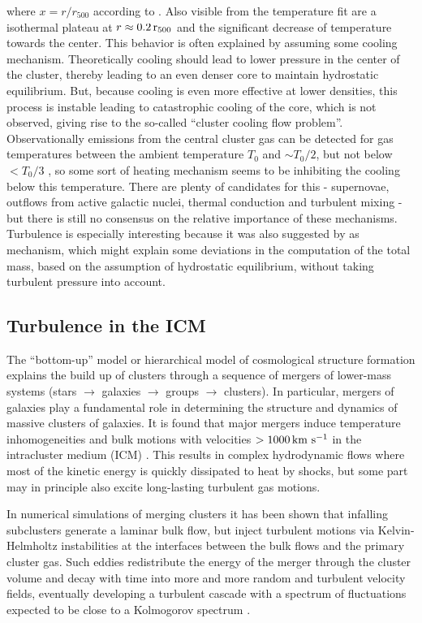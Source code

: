 where $x=r/r_{500}$ according to \citep{Vikhlinin2006}. Also visible from the
temperature fit are a isothermal plateau at $r \approx \unit[0.2]{r_{500}}$ and
the significant decrease of temperature towards the center. This behavior is
often
explained by assuming some cooling mechanism. Theoretically cooling
should lead to lower pressure in the center of the cluster, thereby leading to
an even denser core to maintain hydrostatic equilibrium. But, because cooling is
even more effective at lower densities, this process is instable leading to
catastrophic cooling of the core, which is not observed, giving rise to the
so-called ``cluster cooling flow problem''. Observationally emissions from the
central cluster gas can be detected for gas temperatures between the ambient
temperature $T_0$ and $\sim T_0/2$, but not below $<T_0/3$ \citep{Peterson2003},
so some sort of heating mechanism seems to be inhibiting the cooling below this 
temperature. There are plenty of candidates for this - supernovae, outflows
from active galactic nuclei, thermal conduction and turbulent mixing - but
there is still no consensus on the relative importance of these mechanisms.
Turbulence is especially interesting because it was also
suggested by \citet{Nagai2007} as mechanism, which might explain some
deviations in the computation of the total mass,
based on the assumption of hydrostatic equilibrium, without taking
turbulent pressure into account. 

\subsection{Turbulence in the ICM}
The ``bottom-up'' model or hierarchical model of cosmological structure
formation
\citep[eg.,][]{Ostriker1993} explains the build up of clusters through a
sequence of mergers of lower-mass systems (stars $\rightarrow$ galaxies
$\rightarrow$ groups $\rightarrow$ clusters). In particular, mergers of galaxies
play a fundamental role in 
determining the structure and dynamics of massive clusters of galaxies. It is
found that major mergers induce temperature inhomogeneities and bulk motions
with velocities $> \unit[1000]{km\ s^{-1}}$ in the intracluster medium (ICM)
\citep{Norman1999a}. This results in complex hydrodynamic flows where most of
the kinetic energy is quickly dissipated to heat by shocks, but some part may in
principle also excite long-lasting turbulent gas motions.

In numerical simulations of merging clusters \citep{Schindler1993, 
Roettiger1997,Ricker2001,Takizawa2005} it has been shown that infalling
subclusters generate a laminar bulk flow, but inject turbulent motions via
Kelvin-Helmholtz instabilities at the interfaces between the bulk flows and the
primary cluster gas. Such eddies redistribute the energy of the merger through
the cluster volume and decay with time into more and more random and turbulent
velocity fields, eventually developing a turbulent cascade with a spectrum of
fluctuations expected to be close to a Kolmogorov spectrum \citep{Dolag2005}. 

